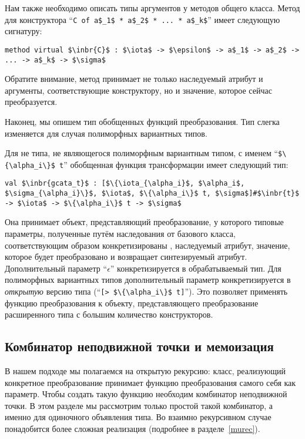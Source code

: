 Нам также необходимо описать типы аргументов у методов общего класса. Метод для конструктора  ``\lstinline|C of a$_1$ * a$_2$ * ... * a$_k$|'' имеет следующую сигнатуру:

\begin{lstlisting}
method virtual $\inbr{C}$ : $\iota$ -> $\epsilon$ -> a$_1$ -> a$_2$ -> ... -> a$_k$ -> $\sigma$
\end{lstlisting}

Обратите внимание, метод принимает не только наследуемый атрибут и аргументы, соответствующие конструктору, но и значение, которое сейчас преобразуется.

Наконец, мы опишем тип обобщенных функций преобразования. Тип слегка изменяется для случая полиморфных вариантных типов.


Для не типа, не являющегося полиморфным вариантным типом, с именем ``\lstinline|$\{\alpha_i\}$ t|'' обобщенная функция трансформации имеет следующий тип:

\begin{lstlisting}
val $\inbr{gcata_t}$ : [$\{\iota_{\alpha_i}$, $\alpha_i$, $\sigma_{\alpha_i}\}$, $\iota$, $\{\alpha_i\}$ t, $\sigma$]#$\inbr{t}$ -> $\iota$ -> $\{\alpha_i\}$ t -> $\sigma$
\end{lstlisting}

Она принимает объект, представляющий преобразование, у которого типовые параметры, полученные путём наследования от базового класса, соответствующим образом конкретизированы , наследуемый атрибут, значение, которое будет преобразовано и возвращает синтезируемый атрибут.
Дополнительный параметр ``$\epsilon$'' конкретизируется в обрабатываемый тип. 
Для полиморфных вариантных типов дополнительный параметр конкретизируется в \emph{открытую}
версию типа  (``\lstinline|[> $\{\alpha_i\}$ t]|''). 
Это позволяет применять функцию преобразования к объекту, представляющего преобразование расширенного типа с большим количество конструкторов.


\subsection{Комбинатор неподвижной точки и мемоизация}
\label{memofix}

В нашем подходе мы полагаемся  на открытую рекурсию: класс, реализующий конкретное преобразование принимает функцию преобразования самого себя как параметр.
Чтобы создать такую функцию необходим комбинатор неподвижной точки. В  этом разделе
мы рассмотрим только простой такой комбинатор, а именно для одиночного объявления типа.
Во взаимно рекурсивном случае понадобится более сложная реализация (подробнее в 
разделе~\ref{murec}).

